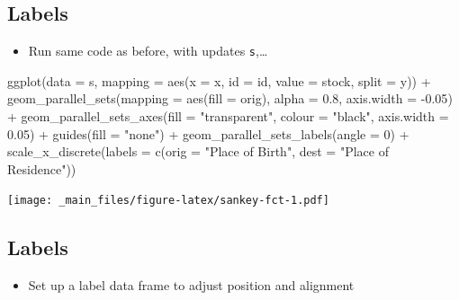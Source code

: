 \documentclass[
]{book}
\newenvironment{Shaded}{\begin{snugshade}}{\end{snugshade}}
\newcommand{\AttributeTok}[1]{\textcolor[rgb]{0.77,0.63,0.00}{#1}}
\newcommand{\DecValTok}[1]{\textcolor[rgb]{0.00,0.00,0.81}{#1}}
\newcommand{\FloatTok}[1]{\textcolor[rgb]{0.00,0.00,0.81}{#1}}
\newcommand{\FunctionTok}[1]{\textcolor[rgb]{0.00,0.00,0.00}{#1}}
\newcommand{\NormalTok}[1]{#1}
\newcommand{\SpecialCharTok}[1]{\textcolor[rgb]{0.00,0.00,0.00}{#1}}
\newcommand{\StringTok}[1]{\textcolor[rgb]{0.31,0.60,0.02}{#1}}
\providecommand{\tightlist}{%
  \setlength{\itemsep}{0pt}\setlength{\parskip}{0pt}}
\begin{document}
\hypertarget{labels-9}{%
\subsection{Labels}\label{labels-9}}

\begin{itemize}
\tightlist
\item
  Run same code as before, with updates \texttt{s},\ldots{}
\end{itemize}

\begin{Shaded}
\begin{Highlighting}[]
\FunctionTok{ggplot}\NormalTok{(}\AttributeTok{data =}\NormalTok{ s,}
       \AttributeTok{mapping =} \FunctionTok{aes}\NormalTok{(}\AttributeTok{x =}\NormalTok{ x, }\AttributeTok{id =}\NormalTok{ id, }\AttributeTok{value =}\NormalTok{ stock, }\AttributeTok{split =}\NormalTok{ y)) }\SpecialCharTok{+}
  \FunctionTok{geom\_parallel\_sets}\NormalTok{(}\AttributeTok{mapping =} \FunctionTok{aes}\NormalTok{(}\AttributeTok{fill =}\NormalTok{ orig), }\AttributeTok{alpha =} \FloatTok{0.8}\NormalTok{, }\AttributeTok{axis.width =} \SpecialCharTok{{-}}\FloatTok{0.05}\NormalTok{) }\SpecialCharTok{+}
  \FunctionTok{geom\_parallel\_sets\_axes}\NormalTok{(}\AttributeTok{fill =} \StringTok{"transparent"}\NormalTok{, }\AttributeTok{colour =} \StringTok{"black"}\NormalTok{, }
                          \AttributeTok{axis.width =} \FloatTok{0.05}\NormalTok{) }\SpecialCharTok{+}
  \FunctionTok{guides}\NormalTok{(}\AttributeTok{fill =} \StringTok{"none"}\NormalTok{) }\SpecialCharTok{+}
  \FunctionTok{geom\_parallel\_sets\_labels}\NormalTok{(}\AttributeTok{angle =} \DecValTok{0}\NormalTok{) }\SpecialCharTok{+}
  \FunctionTok{scale\_x\_discrete}\NormalTok{(}\AttributeTok{labels =} \FunctionTok{c}\NormalTok{(}\AttributeTok{orig =} \StringTok{"Place of Birth"}\NormalTok{, }
                              \AttributeTok{dest =} \StringTok{"Place of Residence"}\NormalTok{))}
\end{Highlighting}
\end{Shaded}

\texttt{[image: \_main\_files/figure-latex/sankey-fct-1.pdf]}

\hypertarget{labels-10}{%
\subsection{Labels}\label{labels-10}}

\begin{itemize}
\tightlist
\item
  Set up a label data frame to adjust position and alignment
\end{itemize}
\end{document}

